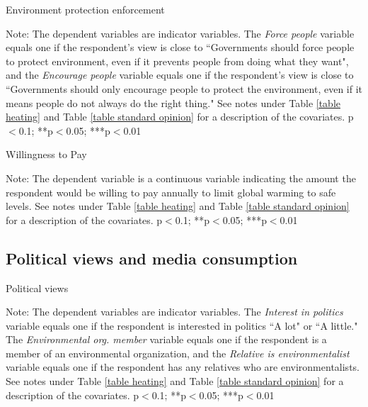 \documentclass{article}
\begin{document}
\begin{table}[h!]
	\caption{Environment protection enforcement}
	\begin{center}
		\scalebox{0.7}{}
	\end{center}
	{\footnotesize Note: The dependent variables are indicator variables. The \textit{Force people} variable equals one if the respondent's view is close to ``Governments should force people to protect environment, even if it prevents people from doing what they want", and the \textit{Encourage people} variable equals one if the respondent's view is close to ``Governments should only encourage people to protect the environment, even if it means people do not always do the right thing." See notes under Table \ref{table heating} and Table \ref{table standard opinion} for a description of the covariates.
	\newline *p$<$0.1; **p$<$0.05; ***p$<$0.01}
\end{table}	

\begin{table}[h!]
	\caption{Willingness to Pay}
	\begin{center}
		\scalebox{0.7}{}
	\end{center}
	{\footnotesize Note: The dependent variable is a continuous variable indicating the amount the respondent would be willing to pay annually to limit global warming to safe levels. See notes under Table \ref{table heating} and Table \ref{table standard opinion} for a description of the covariates.
	\newline *p$<$0.1; **p$<$0.05; ***p$<$0.01}
\end{table}	

\clearpage
\subsection{Political views and media consumption}

\begin{table}[h!]
	\caption{Political views}
	\begin{center}
		\scalebox{0.7}{}
	\end{center}
	{\footnotesize Note: The dependent variables are indicator variables. The \textit{Interest in politics} variable equals one if the respondent is interested in politics ``A lot" or ``A little." The \textit{Environmental org. member} variable equals one if the respondent is a member of an environmental organization, and the \textit{Relative is environmentalist} variable equals one if the respondent has any relatives who are environmentalists. See notes under Table \ref{table heating} and Table \ref{table standard opinion} for a description of the covariates.
	\newline *p$<$0.1; **p$<$0.05; ***p$<$0.01}
\end{table}	
\end{document}
